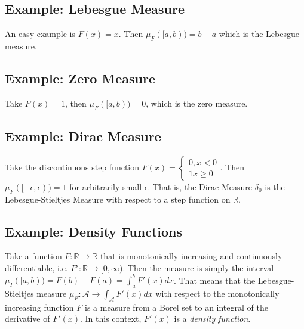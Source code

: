 \subsection{Example: Lebesgue Measure}
An easy example is $F(x) = x$. Then $\mu_F([a,b)) = b-a$ which is the Lebesgue measure.

\subsection{Example: Zero Measure}
Take $F(x) = 1$, then $\mu_F([a,b)) = 0$, which is the zero measure.

\subsection{Example: Dirac Measure}
Take the discontinuous step function $F(x) = \left\{\begin{array}{l} 0, x < 0\\ 1 x\geq 0 \end{array}\right.$. Then $\mu_F([-\epsilon,\epsilon)) = 1$ for arbitrarily small $\epsilon$. That is, the Dirac Measure $\delta_0$ is the Lebesgue-Stieltjes Measure with respect to a step function on $\mathscr{\mathbb{R}}$.

\subsection{Example: Density Functions}
Take a function $F:\mathbb{R} \rightarrow \mathbb{R}$ that is monotonically increasing and continuously differentiable, i.e. $F':\mathbb{R} \rightarrow [0,\infty)$. Then the measure is simply the interval $\mu_I([a,b)) = F(b) - F(a) = \int_a^b F'(x) dx$. That means that the Lebesgue-Stieltjes measure $\mu_F: \mathscr{A} \rightarrow \int_{\mathscr{A}}F'(x) dx$ with respect to the monotonically increasing function $F$ is a measure from a Borel set to an integral of the derivative of $F'(x)$. In this context, $F'(x)$ is a \textit{density function}.



 